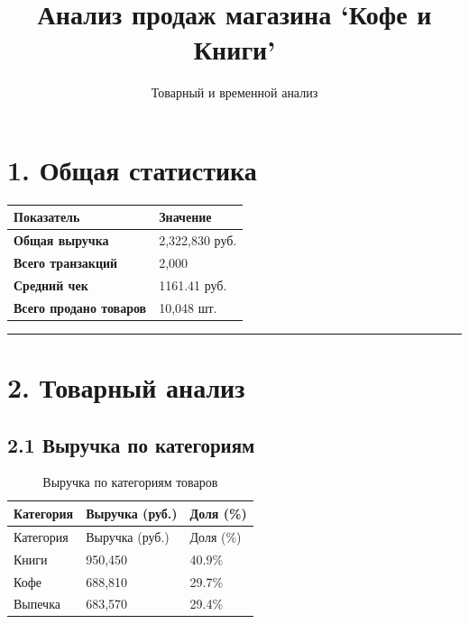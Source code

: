 \documentclass[
]{article}
\title{Анализ продаж магазина `Кофе и Книги'}
\author{Товарный и временной анализ}
\date{}
\begin{document}
\maketitle

{
\setcounter{tocdepth}{2}
\tableofcontents
}
\section{1. Общая
статистика}\label{ux43eux431ux449ux430ux44f-ux441ux442ux430ux442ux438ux441ux442ux438ux43aux430}

\begin{longtable}[]{@{}ll@{}}
\toprule\noalign{}
Показатель & Значение \\
\midrule\noalign{}
\endhead
\bottomrule\noalign{}
\endlastfoot
\textbf{Общая выручка} & 2,322,830 руб. \\
\textbf{Всего транзакций} & 2,000 \\
\textbf{Средний чек} & 1161.41 руб. \\
\textbf{Всего продано товаров} & 10,048 шт. \\
\end{longtable}

\begin{center}\rule{0.5\linewidth}{0.5pt}\end{center}

\section{2. Товарный
анализ}\label{ux442ux43eux432ux430ux440ux43dux44bux439-ux430ux43dux430ux43bux438ux437}

\subsection{2.1 Выручка по
категориям}\label{ux432ux44bux440ux443ux447ux43aux430-ux43fux43e-ux43aux430ux442ux435ux433ux43eux440ux438ux44fux43c}

\begin{longtable}[]{@{}lll@{}}
\caption{Выручка по категориям товаров}\tabularnewline
\toprule\noalign{}
Категория & Выручка (руб.) & Доля (\%) \\
\midrule\noalign{}
\endfirsthead
\toprule\noalign{}
Категория & Выручка (руб.) & Доля (\%) \\
\midrule\noalign{}
\endhead
\bottomrule\noalign{}
\endlastfoot
Книги & 950,450 & 40.9\% \\
Кофе & 688,810 & 29.7\% \\
Выпечка & 683,570 & 29.4\% \\
\end{longtable}
\end{document}
